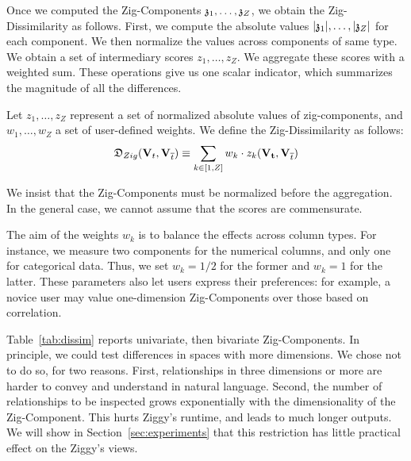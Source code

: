 Once we computed the Zig-Components $\mathfrak{z}_1, \ldots, \mathfrak{z}_Z$, we obtain the
Zig-Dissimilarity as follows. First, we compute the absolute values
$|\mathfrak{z}_1|, \ldots, |\mathfrak{z}_Z|$ for each component. We then normalize the
values across components of same type. We obtain a set of intermediary scores
$z_1, \ldots, z_Z$. We aggregate these scores with a weighted sum.
These operations give us one scalar indicator, which summarizes the magnitude
of all the differences.

\begin{definition}
    Let $z_1, \ldots, z_Z$ represent a set of normalized absolute values of
    zig-components, and $w_1, \ldots, w_Z$ a set of user-defined weights.  We
    define the Zig-Dissimilarity as follows: 
    \begin{equation}
        \mathfrak{D}_{Zig}(\mathbf{V}_t, \mathbf{V}_{\overline{t}}) 
        \equiv \sum_{k \in [1, Z]} w_k \cdot z_k(\mathbf{V_t}, \mathbf{V}_{\overline{t}})
    \end{equation}
\end{definition}
We insist that the Zig-Components must be normalized before the aggregation.
In the general case, we cannot assume that the scores are commensurate.

The aim of the weights $w_k$ is to balance the effects across column types. For
instance, we measure two components for the numerical columns, and only one for
categorical data.  Thus, we set $w_k = 1/2$ for the former and $w_k = 1$
for the latter.  These parameters also let users express their preferences: for
example, a novice user may value one-dimension Zig-Components over those based
on correlation.

Table~\ref{tab:dissim} reports univariate, then bivariate Zig-Components.  In
principle, we could test differences in spaces with more dimensions.  We chose
not to do so, for two reasons. First, relationships in three dimensions or more
are harder to convey and understand in natural language.  Second, the number of
relationships to be inspected grows exponentially with the dimensionality of
the Zig-Component. This hurts Ziggy's runtime, and leads to much longer
outputs. We will show in Section~\ref{sec:experiments} that this restriction
has little practical effect on the Ziggy's views.


